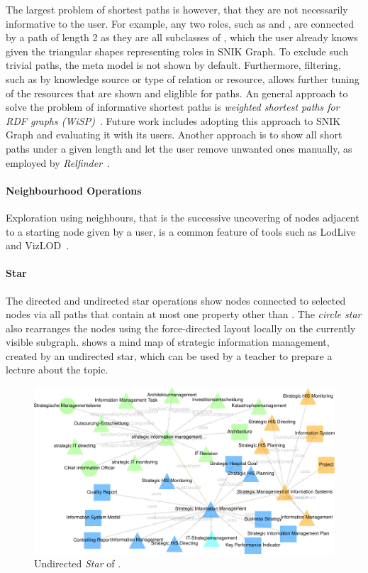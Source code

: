 \documentclass[conference]{IEEEtran}
\begin{document}
The largest problem of shortest paths is however, that they are not necessarily informative to the user. 
For example, any two roles, such as  and , are connected by a path of length 2 as they are all subclasses of , which the user already knows given the triangular shapes representing roles in SNIK Graph.
To exclude such trivial paths,  the meta model is not shown by default.
Furthermore, filtering, such as by knowledge source or type of relation or resource, allows further tuning of the resources that are shown and eliglible for paths.
An general approach to solve the problem of informative shortest paths is \emph{weighted shortest paths for RDF graphs (WiSP)}~\cite{wisp}.
Future work includes adopting this approach to SNIK Graph and evaluating it with its users.
Another approach is to show all short paths under a given length and let the user remove unwanted ones manually, as employed by \emph{Relfinder}~\cite{relfinder}.

\paragraph{Neighbourhood Operations}
Exploration using neighbours, that is the successive uncovering of nodes adjacent to a starting node given by a user, is a common feature of tools such as LodLive~\cite{lodlive} and VizLOD~\cite{vizlod}.%
\paragraph{Star}
The directed and undirected star operations show nodes connected to selected nodes via all paths that contain at most one property other than .
The \emph{circle star} also rearranges the nodes using the force-directed layout locally on the currently visible subgraph.
 shows a mind map of strategic information management, created by an undirected star, which can be used by a teacher to prepare a lecture about the topic.
\begin{figure}[h!]
    \centering
    \includegraphics[width=\columnwidth]{img/strategic-im.pdf}
    \caption{Undirected \emph{Star} of .}
	\label{fig:star}
\end{figure}
\vspace{-3pt}
\end{document}
